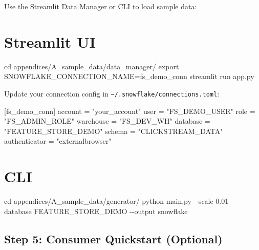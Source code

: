 \documentclass[
  letterpaper,
  DIV=11,
  numbers=noendperiod]{scrreprt}
\newenvironment{Shaded}{\begin{snugshade}}{\end{snugshade}}
\newcommand{\AttributeTok}[1]{\textcolor[rgb]{0.40,0.45,0.13}{#1}}
\newcommand{\BuiltInTok}[1]{\textcolor[rgb]{0.00,0.23,0.31}{#1}}
\newcommand{\DataTypeTok}[1]{\textcolor[rgb]{0.68,0.00,0.00}{#1}}
\newcommand{\ExtensionTok}[1]{\textcolor[rgb]{0.00,0.23,0.31}{#1}}
\newcommand{\KeywordTok}[1]{\textcolor[rgb]{0.00,0.23,0.31}{#1}}
\newcommand{\NormalTok}[1]{\textcolor[rgb]{0.00,0.23,0.31}{#1}}
\newcommand{\OperatorTok}[1]{\textcolor[rgb]{0.37,0.37,0.37}{#1}}
\newcommand{\StringTok}[1]{\textcolor[rgb]{0.13,0.47,0.30}{#1}}
\newcommand{\VariableTok}[1]{\textcolor[rgb]{0.07,0.07,0.07}{#1}}
\begin{document}
Use the Streamlit Data Manager or CLI to load sample data:

\section{Streamlit UI}

\begin{Shaded}
\begin{Highlighting}[]
\BuiltInTok{cd}\NormalTok{ appendices/A\_sample\_data/data\_manager/}
\BuiltInTok{export} \VariableTok{SNOWFLAKE\_CONNECTION\_NAME}\OperatorTok{=}\NormalTok{fs\_demo\_conn}
\ExtensionTok{streamlit}\NormalTok{ run app.py}
\end{Highlighting}
\end{Shaded}

Update your connection config in
\texttt{\textasciitilde{}/.snowflake/connections.toml}:

\begin{Shaded}
\begin{Highlighting}[]
\KeywordTok{[}\DataTypeTok{fs\_demo\_conn}\KeywordTok{]}
\DataTypeTok{account} \OperatorTok{=} \StringTok{"your\_account"}
\DataTypeTok{user} \OperatorTok{=} \StringTok{"FS\_DEMO\_USER"}
\DataTypeTok{role} \OperatorTok{=} \StringTok{"FS\_ADMIN\_ROLE"}
\DataTypeTok{warehouse} \OperatorTok{=} \StringTok{"FS\_DEV\_WH"}
\DataTypeTok{database} \OperatorTok{=} \StringTok{"FEATURE\_STORE\_DEMO"}
\DataTypeTok{schema} \OperatorTok{=} \StringTok{"CLICKSTREAM\_DATA"}
\DataTypeTok{authenticator} \OperatorTok{=} \StringTok{"externalbrowser"}
\end{Highlighting}
\end{Shaded}

\section{CLI}

\begin{Shaded}
\begin{Highlighting}[]
\BuiltInTok{cd}\NormalTok{ appendices/A\_sample\_data/generator/}
\ExtensionTok{python}\NormalTok{ main.py }\AttributeTok{{-}{-}scale}\NormalTok{ 0.01 }\AttributeTok{{-}{-}database}\NormalTok{ FEATURE\_STORE\_DEMO }\AttributeTok{{-}{-}output}\NormalTok{ snowflake}
\end{Highlighting}
\end{Shaded}

\hypertarget{step-5-consumer-quickstart-optional}{%
\subsection{Step 5: Consumer Quickstart
(Optional)}\label{step-5-consumer-quickstart-optional}}
\end{document}
